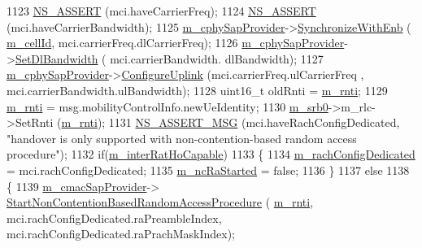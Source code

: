 \begin{DoxyCode}
1123           \hyperlink{assert_8h_a6dccdb0de9b252f60088ce281c49d052}{NS\_ASSERT} (mci.haveCarrierFreq);
1124           \hyperlink{assert_8h_a6dccdb0de9b252f60088ce281c49d052}{NS\_ASSERT} (mci.haveCarrierBandwidth);
1125           \hyperlink{classns3_1_1LteUeRrc_a0441858e31f56c75678afa92b7c7193d}{m\_cphySapProvider}->\hyperlink{classns3_1_1LteUeCphySapProvider_ad906fdd10d4937b67f41f5455dc5cd91}{SynchronizeWithEnb} (
      \hyperlink{classns3_1_1LteUeRrc_aa9d3317734eea9158371d9fccf3a0c48}{m\_cellId}, mci.carrierFreq.dlCarrierFreq);
1126           \hyperlink{classns3_1_1LteUeRrc_a0441858e31f56c75678afa92b7c7193d}{m\_cphySapProvider}->\hyperlink{classns3_1_1LteUeCphySapProvider_a6b77b03695f82cd342c2462c9fe12e85}{SetDlBandwidth} ( mci.carrierBandwidth.
      dlBandwidth);
1127           \hyperlink{classns3_1_1LteUeRrc_a0441858e31f56c75678afa92b7c7193d}{m\_cphySapProvider}->\hyperlink{classns3_1_1LteUeCphySapProvider_aa24d42854142c74d40a9a334c9e6884b}{ConfigureUplink} (mci.carrierFreq.ulCarrierFreq
      , mci.carrierBandwidth.ulBandwidth); 
1128           uint16\_t oldRnti = \hyperlink{classns3_1_1LteUeRrc_a8e078d8ef0ad23e670fe2ef08caab84f}{m\_rnti};
1129           \hyperlink{classns3_1_1LteUeRrc_a8e078d8ef0ad23e670fe2ef08caab84f}{m\_rnti} = msg.mobilityControlInfo.newUeIdentity;
1130           \hyperlink{classns3_1_1LteUeRrc_a1ed76d4e424d770de67c3e39f516ac4d}{m\_srb0}->m\_rlc->SetRnti (\hyperlink{classns3_1_1LteUeRrc_a8e078d8ef0ad23e670fe2ef08caab84f}{m\_rnti});
1131           \hyperlink{assert_8h_aff5ece9066c74e681e74999856f08539}{NS\_ASSERT\_MSG} (mci.haveRachConfigDedicated, \textcolor{stringliteral}{"handover is only supported with
       non-contention-based random access procedure"});
1132           \textcolor{keywordflow}{if}(\hyperlink{classns3_1_1LteUeRrc_a0702e1a453de2d8f1c454fea344ef4f0}{m\_interRatHoCapable})
1133           \{
1134             \hyperlink{classns3_1_1LteUeRrc_a926593f8b804731968b52072ba31bfa8}{m\_rachConfigDedicated} = mci.rachConfigDedicated;
1135             \hyperlink{classns3_1_1LteUeRrc_a15d55f6ff2b347d2ea0610b66513fbdb}{m\_ncRaStarted} = \textcolor{keyword}{false};
1136           \}
1137           \textcolor{keywordflow}{else}
1138           \{
1139             \hyperlink{classns3_1_1LteUeRrc_a5a7bffd2040d73eb5db1aaef849d0396}{m\_cmacSapProvider}->
      \hyperlink{classns3_1_1LteUeCmacSapProvider_ad2b328271d2631f4800b9d7a8567c6e9}{StartNonContentionBasedRandomAccessProcedure} (
      \hyperlink{classns3_1_1LteUeRrc_a8e078d8ef0ad23e670fe2ef08caab84f}{m\_rnti}, mci.rachConfigDedicated.raPreambleIndex, mci.rachConfigDedicated.raPrachMaskIndex);

\end{DoxyCode}
